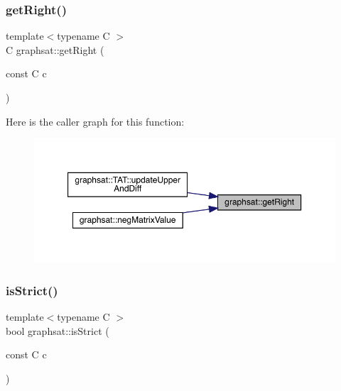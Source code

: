 \subsubsection{\texorpdfstring{getRight()}{getRight()}}
{\footnotesize\ttfamily template$<$typename C $>$ \\
C graphsat\+::get\+Right (\begin{DoxyParamCaption}\item[{const C}]{c }\end{DoxyParamCaption})\hspace{0.3cm}{\ttfamily [inline]}}

Here is the caller graph for this function\+:
\nopagebreak
\begin{figure}[H]
\begin{center}
\leavevmode
\includegraphics[width=350pt]{namespacegraphsat_a7365b322cc23cabf0402ef03e6daafc7_icgraph}
\end{center}
\end{figure}
\mbox{\label{namespacegraphsat_a8c9f56766915c3d206d61da59ce005d1}} 
\subsubsection{\texorpdfstring{isStrict()}{isStrict()}}
{\footnotesize\ttfamily template$<$typename C $>$ \\
bool graphsat\+::is\+Strict (\begin{DoxyParamCaption}\item[{const C}]{c }\end{DoxyParamCaption})\hspace{0.3cm}{\ttfamily [inline]}}

